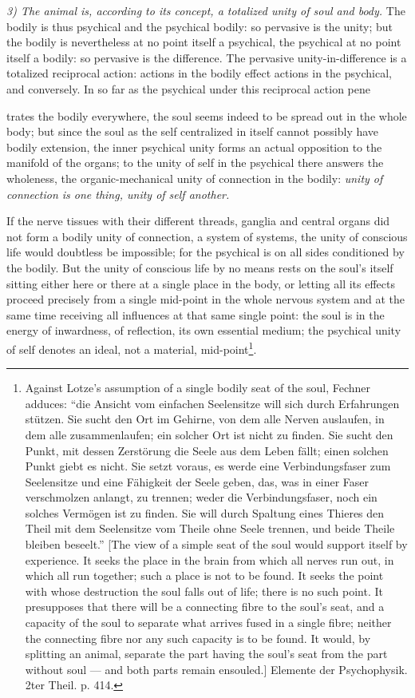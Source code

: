 \documentclass[12pt,a4paper]{book}
\begin{document}
\emph{3) The animal is, according to its concept, a totalized unity of soul and body.}
The bodily is thus psychical and the psychical bodily: so pervasive is the unity; but
the bodily is nevertheless at no point itself a psychical, the psychical at no point
itself a bodily: so pervasive is the difference. The pervasive unity-in-difference is
a totalized reciprocal action: actions in the bodily effect actions in the psychical,
and conversely. In so far as the psychical under this reciprocal action pene%

\setcounter{footnote}{0}%
trates the bodily everywhere, the soul seems indeed to be spread out in the whole
body; but since the soul as the self centralized in itself cannot possibly have bodily
extension, the inner psychical unity forms an actual opposition to the manifold of the
organs; to the unity of self in the psychical there answers the wholeness, the
organic-mechanical unity of connection in the bodily: \emph{unity of connection is one
thing, unity of self another.}

If the nerve tissues with their different threads, ganglia and central organs did not
form a bodily unity of connection, a system of systems, the unity of conscious life
would doubtless be impossible; for the psychical is on all sides conditioned by the
bodily. But the unity of conscious life by no means rests on the soul's itself sitting
either here or there at a single place in the body, or letting all its effects proceed
precisely from a single mid-point in the whole nervous system and at the same time
receiving all influences at that same single point: the soul is in the energy of
inwardness, of reflection, its own essential medium; the psychical unity of self
denotes an ideal, not a material, mid-point\footnote{Against Lotze's assumption of a
single bodily seat of the soul, Fechner adduces: ``die Ansicht vom einfachen
Seelensitze will sich durch Erfahrungen stützen. Sie sucht den Ort im Gehirne, von dem
alle Nerven auslaufen, in dem alle zusammenlaufen; ein solcher Ort ist nicht zu finden.
Sie sucht den Punkt, mit dessen Zerstörung die Seele aus dem Leben fällt; einen solchen
Punkt giebt es nicht. Sie setzt voraus, es werde eine Verbindungsfaser zum Seelensitze
und eine Fähigkeit der Seele geben, das, was in einer Faser verschmolzen anlangt, zu
trennen; weder die Verbindungsfaser, noch ein solches Vermögen ist zu finden. Sie will
durch Spaltung eines Thieres den Theil mit dem Seelensitze vom Theile ohne Seele
trennen, und beide Theile bleiben beseelt.'' [The view of a simple seat of the soul
would support itself by experience. It seeks the place in the brain from which all
nerves run out, in which all run together; such a place is not to be found. It seeks
the point with whose destruction the soul falls out of life; there is no such point.
It presupposes that there will be a connecting fibre to the soul's seat, and a capacity
of the soul to separate what arrives fused in a single fibre; neither the connecting
fibre nor any such capacity is to be found. It would, by splitting an animal, separate
the part having the soul's seat from the part without soul --- and both parts remain
ensouled.] Elemente der Psychophysik. 2ter Theil. p. 414.}.
\end{document}
